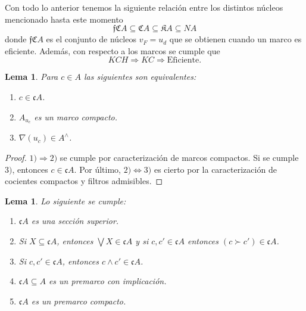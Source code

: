 \documentclass[11pt]{amsart}
\theoremstyle{plain}
\newtheorem{lem}[thm]{Lema}
\theoremstyle{definition}
\begin{document}
Con todo lo anterior tenemos la siguiente relación entre los distintos núcleos mencionado hasta este momento
\[
\mathfrak{f}\mathfrak{C}A\subseteq \mathfrak{C}A\subseteq \mathfrak{K}A\subseteq NA
\]
donde $\mathfrak{f}\mathfrak{C}A$ es el conjunto de núcleos $v_F=u_d$ que se obtienen cuando un marco es eficiente. Además, con respecto a los marcos se cumple que
\[
KCH\Rightarrow KC\Rightarrow \mbox{Eficiente}.
\]

\begin{lem}\label{Lema2.2}
    Para $c\in A$ las siguientes son equivalentes:
    \begin{enumerate}
        \item $c\in \mathfrak{c}A$.
        \item $A_{u_c}$ es un marco compacto.
        \item $\nabla(u_c)\in A^\wedge$.
    \end{enumerate}
\end{lem}

\begin{proof}
    $1)\Rightarrow 2)$ se cumple por caracterización de marcos compactos. Si se cumple $3)$, entonces $c\in \mathfrak{c}A$. Por último, $2) \Leftrightarrow 3)$ es cierto por la caracterización de cocientes compactos y filtros admisibles. 
\end{proof}

\begin{lem}\label{Lema2.3}
    Lo siguiente se cumple:
    \begin{enumerate}
        \item $\mathfrak{c}A$ es una sección superior.
        \item Si $X\subseteq \mathfrak{c}A$, entonces $\bigvee X\in \mathfrak{c}A$ y si $c, c'\in \mathfrak{c}A$ entonces $(c\succ c')\in \mathfrak{c}A$.
        \item Si $c, c'\in \mathfrak{c}A$, entonces $c\wedge c'\in \mathfrak{c}A$.
        \item $\mathfrak{c}A\subseteq A$ es un premarco con implicación.
        \item $\mathfrak{c}A$ es un premarco compacto.
    \end{enumerate}
\end{lem}
\end{document}
